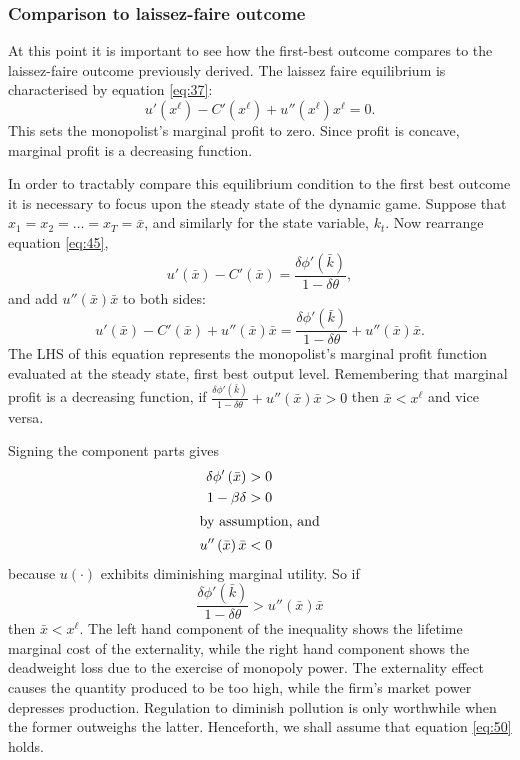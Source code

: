\subsubsection{Comparison to laissez-faire outcome}
\label{sec:comp-laiss-faire}

At this point it is important to see how the first-best outcome
compares to the laissez-faire outcome previously derived. The laissez
faire equilibrium is characterised by equation \eqref{eq:37}:
\begin{equation}
  \label{eq:46}
  u'\left( x^{\ell}\right) - C'\left( x^{\ell}\right) + u''\left(
    x^{\ell}\right) x^{\ell} = 0.
\end{equation}
This sets the monopolist's marginal profit to zero. Since profit is
concave, marginal profit is a decreasing function.

In order to tractably compare this equilibrium condition to the first
best outcome it is necessary to focus upon the steady state of the
dynamic game. Suppose that $x_1 = x_2 = \ldots = x_T = \bar{x}$, and
similarly for the state variable, $k_t$. Now rearrange equation
\eqref{eq:45},
\begin{equation}
  \label{eq:47}
  u'\left( \bar{x}\right) - C'\left( \bar{x}\right) =
  \frac{\delta\phi'\left( \bar{k}\right)}{1-\delta\theta},
\end{equation}
and add $u''\left( \bar{x}\right) \bar{x}$ to both sides:
\begin{equation}
  \label{eq:48}
  u'\left( \bar{x}\right) - C'\left( \bar{x}\right) +
  u''\left( \bar{x}\right) \bar{x} = \frac{\delta\phi'\left(
      \bar{k}\right)}{1-\delta\theta} + u''\left( \bar{x}\right)
  \bar{x}.
\end{equation}
The LHS of this equation represents the monopolist's marginal profit
function evaluated at the steady state, first best output
level. Remembering that marginal profit is a decreasing function, if
$\frac{\delta\phi'\left( \bar{k}\right)}{1-\delta\theta} + u''\left(
  \bar{x}\right) \bar{x} > 0$ then $\bar{x} < x^{\ell}$ and vice
versa.

Signing the component parts gives
\begin{align}
  \label{eq:49}
  \delta\phi'\left( \bar{x}\right) &> 0 \\
  1-\beta\delta &> 0 \\
  \intertext{by assumption, and}
  u''\left( \bar{x}\right) \bar{x} &< 0
\end{align}
because $u(\cdot)$ exhibits diminishing marginal utility. So if
\begin{equation}
  \label{eq:50}
  \frac{\delta\phi'\left( \bar{k}\right)}{1-\delta\theta} > u''\left(
    \bar{x}\right) \bar{x}
\end{equation}
then $\bar{x} < x^{\ell}$. The left hand component of the inequality
shows the lifetime marginal cost of the externality, while the right
hand component shows the deadweight loss due to the exercise of
monopoly power. The externality effect causes the quantity produced to
be too high, while the firm's market power depresses
production. Regulation to diminish pollution is only worthwhile when
the former outweighs the latter. Henceforth, we shall assume that
equation \eqref{eq:50} holds.

